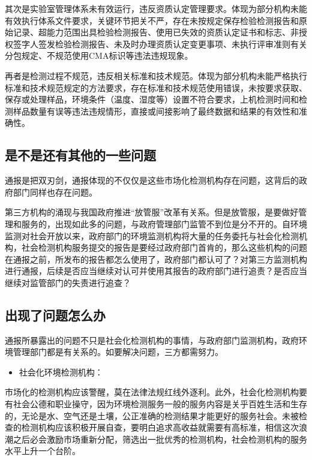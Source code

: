 \documentclass[]{book}
\providecommand{\tightlist}{%
  \setlength{\itemsep}{0pt}\setlength{\parskip}{0pt}}
\begin{document}
其次是实验室管理体系未有效运行，违反资质认定管理要求。体现为部分机构未能有效执行体系文件要求，关键环节把关不严，存在未按规定保存检验检测报告和原始记录、超能力范围出具检验检测报告、使用已失效的资质认定证书和标志、非授权签字人签发检验检测报告、未及时办理资质认定变更事项、未执行评审准则有关分包规定、不规范使用CMA标识等违法违规现象。

再者是检测过程不规范，违反相关标准和技术规范。体现为部分机构未能严格执行标准和技术规范规定的方法要求，存在标准和技术规范使用错误，未按要求获取、保存或处理样品，环境条件（温度、湿度等）设置不符合要求，上机检测时间和检测样品数量有误等违法违规情形，直接或间接影响了最终数据和结果的有效性和准确性。

\hypertarget{ux662fux4e0dux662fux8fd8ux6709ux5176ux4ed6ux7684ux4e00ux4e9bux95eeux9898}{%
\subsection{是不是还有其他的一些问题}\label{ux662fux4e0dux662fux8fd8ux6709ux5176ux4ed6ux7684ux4e00ux4e9bux95eeux9898}}

通报是把双刃剑，通报体现的不仅仅是这些市场化检测机构存在问题，这背后的政府部门同样也存在问题。

第三方机构的涌现与我国政府推进``放管服''改革有关系。但是放管服，是要做好管理和服务的，出现如此多的问题，与政府管理部门监管不到位是分不开的。自环境监测对社会开放以来，政府部门的环境监测机构将大量的任务委托与社会化检测机构，社会检测机构服务提交的报告是要经过政府部门首肯的，那么这些机构的问题在通报之前，所发布的报告都怎么使用了，政府部门都认可了？对第三方监测机构进行通报，后续是否应当继续对认可并使用其报告的政府部门进行追责？是否应当继续对监管部门的失责进行追查？

\hypertarget{ux51faux73b0ux4e86ux95eeux9898ux600eux4e48ux529e}{%
\subsection{出现了问题怎么办}\label{ux51faux73b0ux4e86ux95eeux9898ux600eux4e48ux529e}}

通报所暴露出的问题不只是社会化检测机构的事情，与政府部门监测机构，政府环境管理部门都是有关系的。如要解决问题，三方都需努力。

\begin{itemize}
\tightlist
\item
  社会化环境检测机构：
\end{itemize}

市场化的检测机构应该警醒，莫在法律法规红线外逐利。此外，社会化检测机构要有社会公德和职业操守，因为环境检测服务一般的服务内容是关乎百姓生活和生存的，无论是水、空气还是土壤，公正准确的检测结果才能更好的服务社会。未被检查的检测机构应该积极开展自查，要明白追求高收益就需要有高标准，相信这次浪潮之后必会激励市场重新分配，筛选出一批优秀的检测机构，社会检测机构的服务水平上升一个台阶。
\end{document}
